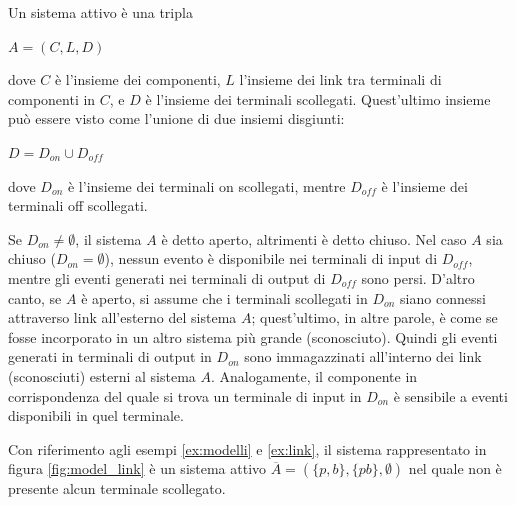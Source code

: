 \begin{defn}
Un sistema attivo è una tripla
\begin{center}
	$ A = (C,L,D)$
\end{center}
dove $C$ è l'insieme dei componenti, $L$ l'insieme dei link tra terminali di componenti in $C$, e $D$ è l'insieme dei terminali scollegati. Quest'ultimo insieme può essere visto come l'unione di due insiemi disgiunti:
\begin{center}
	$ D = D_{on} \cup D_{off}$
\end{center}
dove $D_{on}$ è l'insieme dei terminali on scollegati, mentre $D_{off}$ è l'insieme dei terminali off scollegati. 
\end{defn}
Se $D_{on} \neq \emptyset $, il sistema $A$ è detto aperto, altrimenti è detto chiuso. Nel caso $A$ sia chiuso ($D_{on} = \emptyset$), nessun evento è disponibile nei terminali di input di $D_{off}$, mentre gli eventi generati nei terminali di output di $D_{off}$ sono persi.
D'altro canto, se $A$ è aperto, si assume che i terminali scollegati in $D_{on}$ siano connessi attraverso link all'esterno del sistema $A$; quest'ultimo, in altre parole, è come se fosse incorporato in un altro sistema più grande (sconosciuto). Quindi gli eventi generati in terminali di output in $D_{on}$ sono immagazzinati all'interno dei link (sconosciuti) esterni al sistema $A$. Analogamente, il componente in corrispondenza del quale si trova un terminale di input in $D_{on}$ è sensibile a eventi disponibili in quel terminale.

\begin{ex}
Con riferimento agli esempi \ref{ex:modelli} e \ref{ex:link}, il sistema rappresentato in figura \ref{fig:model_link} è un sistema attivo $\overline A = (\{p,b\},\{pb\},\emptyset)$ nel quale non è presente alcun terminale scollegato.
\end{ex}

